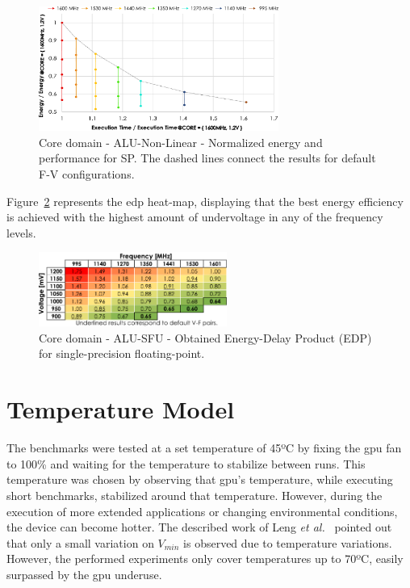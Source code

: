 \begin{figure}[htb]
  \centering
  \includegraphics[width=0.7\textwidth]{Figures/GPU_characterization/SFU_behaviour.pdf}
  \caption{Core domain - ALU-Non-Linear - Normalized energy and performance for SP. The dashed lines connect the results for default F-V configurations.}
  \label{fig:SFU_behaviour}
\end{figure}

Figure~\ref{fig:SFU_EDP} represents the \acrshort{edp} heat-map, displaying that the best energy efficiency is achieved with the highest amount of undervoltage in any of the frequency levels.

\begin{figure}[htb]
    \centering
        \includegraphics[width=0.55\textwidth]{Figures/GPU_characterization/SFU_EDP_SP.pdf}
        \caption{Core domain - ALU-SFU - Obtained Energy-Delay Product (EDP) for single-precision floating-point.}
    \label{fig:SFU_EDP}
\end{figure}

\section{Temperature Model}
\label{sec:temp_model}

The benchmarks were tested at a set temperature of 45ºC by fixing the \acrshort{gpu} fan to 100\% and waiting for the temperature to stabilize between runs. This temperature was chosen by observing that \acrshort{gpu}'s temperature, while executing short benchmarks, stabilized around that temperature. However, during the execution of more extended applications or changing environmental conditions, the device can become hotter. The described work of Leng \textit{et al.}~\cite{leng_safe_2015} pointed out that only a small variation on $V_{min}$ is observed due to temperature variations. However, the performed experiments only cover temperatures up to 70ºC, easily surpassed by the \acrshort{gpu} underuse. 

